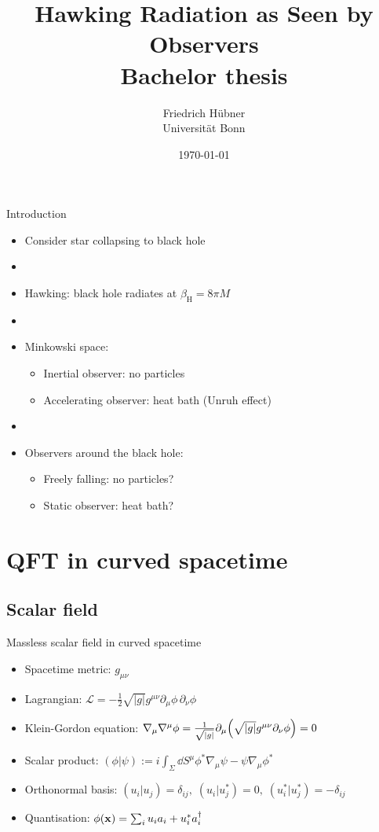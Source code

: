 \documentclass{beamer}
\title[Hawking Radiation for Observers]{\vspace{1cm}Hawking Radiation as Seen by Observers\\\small{Bachelor thesis}}
\author[Friedrich Hübner]{Friedrich Hübner\\Universität Bonn}
\date{\today}
\newcommand{\ind}[1]{_\mathrm{#1}}
\begin{document}
\beamertemplatenavigationsymbolsempty
\titlepage

\begin{frame}{Introduction}
\begin{itemize}
	\item Consider star collapsing to black hole
	\item[]
	\item Hawking\cite{hawking}: black hole radiates at \(\beta\ind{H} = 8\pi M\)
	\item[]
	\item Minkowski space:
		\begin{itemize}
			\item Inertial observer: no particles
			\item Accelerating observer: heat bath (Unruh effect)
		\end{itemize}		 
	\item[]
	\item Observers around the black hole:
		\begin{itemize}
			\item Freely falling: no particles?
			\item Static observer: heat bath?
		\end{itemize}
\end{itemize}
\end{frame}

\frame{\setcounter{tocdepth}{1}\hspace{1cm}\tableofcontents}

\section{QFT in curved spacetime}
\subsection{Scalar field}
\begin{frame}{Massless scalar field in curved spacetime}
\begin{itemize}
	\item Spacetime metric: \(g_{\mu\nu}\)
	\item Lagrangian: \(\mathcal{L} = -\frac{1}{2}\sqrt{|g|} g^{\mu\nu} \partial_\mu \phi\,\partial_\nu \phi\)
	\item Klein-Gordon equation: \(\nabla_\mu\nabla^\mu \phi = \frac{1}{\sqrt{|g|}}\partial_\mu \qty(\sqrt{|g|} g^{\mu\nu} \partial_\nu \phi) = 0\)
	\item Scalar product: \((\phi|\psi) := i \int_{\Sigma}\dd{S^\mu} \phi^*\nabla_\mu \psi - \psi\nabla_\mu \phi^*\)
	\item Orthonormal basis: \((u_i|u_j) = \delta_{ij},\;(u_i|u_j^*) = 0,\;(u_i^*|u_j^*) = -\delta_{ij}\)
	\item Quantisation: \(\phi(\vb{x}) = \sum_i u_i a_i + u_i^*a_i^\dagger\)
\end{itemize}
\end{frame}
\end{document}
